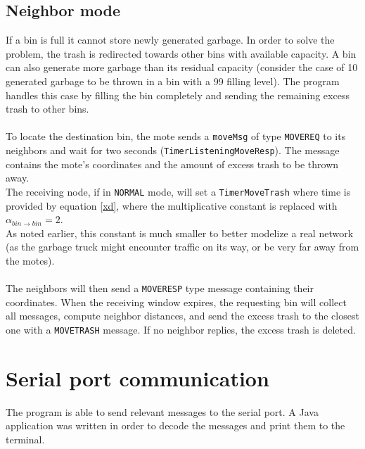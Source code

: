\documentclass[a4paper,10pt]{article}
\begin{document}
\subsection{Neighbor mode}
If a bin is full it cannot store newly generated garbage. In order to solve the problem, the trash is redirected towards other bins with available capacity. A bin can also generate more garbage than its residual capacity (consider the case of 10 generated garbage to be thrown in a bin with a 99 filling level). The program handles this case by filling the bin completely and sending the remaining excess trash to other bins. \\ \\
To locate the destination bin, the mote sends a \texttt{moveMsg} of type \texttt{MOVEREQ} to its neighbors and wait for two seconds (\texttt{TimerListeningMoveResp}). The message contains the mote's coordinates and the amount of excess trash to be thrown away. \\The receiving node, if in \texttt{NORMAL} mode, will set a \texttt{TimerMoveTrash} where time is provided by equation \eqref{xd}, where the multiplicative constant is replaced with $\displaystyle \alpha_{bin\rightarrow bin} = 2$. \\As noted earlier, this constant is much smaller to better modelize a real network (as the garbage truck might encounter traffic on its way, or be very far away from the motes).\\\\
The neighbors will then send a \texttt{MOVERESP} type message containing their coordinates. When the receiving window expires, the requesting bin will collect all messages, compute neighbor distances, and send the excess trash to the closest one with a \texttt{MOVETRASH} message. If no neighbor replies, the excess trash is deleted.
\section{Serial port communication}
The program is able to send relevant messages to the serial port. A Java application was written in order to decode the messages and print them to the terminal.
\end{document}
